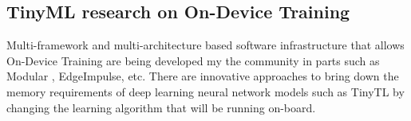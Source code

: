 \subsection{TinyML research on On-Device Training}

Multi-framework and multi-architecture based software infrastructure that allows On-Device Training are being developed my the community in parts such as Modular \cite{mojo}, EdgeImpulse, etc. There are innovative approaches to bring down the memory requirements of deep learning neural network models such as TinyTL \cite{cai2021tinytl} by changing the learning algorithm that will be running on-board.
